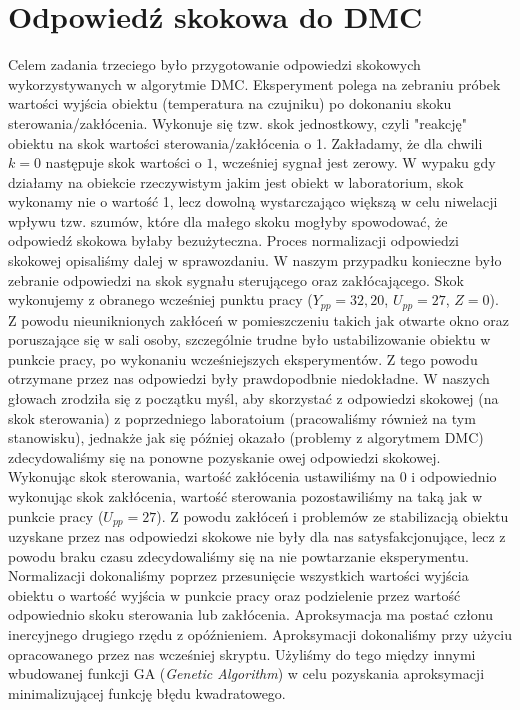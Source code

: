 \chapter{Odpowiedź skokowa do DMC}
Celem zadania trzeciego było przygotowanie odpowiedzi skokowych wykorzystywanych w algorytmie DMC. Eksperyment polega na zebraniu próbek wartości
wyjścia obiektu (temperatura na czujniku) po dokonaniu skoku sterowania/zakłócenia. Wykonuje się tzw. skok jednostkowy, czyli "reakcję" obiektu
na skok wartości sterowania/zakłócenia o 1. Zakładamy, że dla chwili $k=0$ następuje skok wartości o $1$, wcześniej sygnał jest zerowy. W wypaku gdy działamy
na obiekcie rzeczywistym jakim jest obiekt w laboratorium, skok wykonamy nie o wartość 1, lecz dowolną wystarczająco większą w celu niwelacji wpływu tzw. szumów,
które dla małego skoku mogłyby spowodować, że odpowiedź skokowa byłaby bezużyteczna. Proces normalizacji odpowiedzi skokowej opisaliśmy dalej w sprawozdaniu. W naszym
przypadku konieczne było zebranie odpowiedzi na skok sygnału sterującego oraz zakłócającego. Skok wykonujemy
z obranego wcześniej punktu pracy ($Y_{pp} = 32,20$, $U_{pp} = 27$, $Z = 0$). Z powodu nieuniknionych zakłóceń
w pomieszczeniu takich jak otwarte okno oraz poruszające się w sali osoby, szczególnie trudne było ustabilizowanie obiektu w punkcie pracy, po wykonaniu wcześniejszych
eksperymentów. Z tego powodu otrzymane przez nas odpowiedzi były prawdopodbnie niedokładne. W naszych głowach
zrodziła się z początku myśl, aby skorzystać z odpowiedzi skokowej (na skok sterowania) z poprzedniego laboratoium
(pracowaliśmy również na tym stanowisku), jednakże jak się później okazało (problemy z algorytmem DMC) zdecydowaliśmy się
na ponowne pozyskanie owej odpowiedzi skokowej. Wykonując skok sterowania, wartość zakłócenia ustawiliśmy na 0 i odpowiednio
wykonując skok zakłócenia, wartość sterowania pozostawiliśmy na taką jak w punkcie pracy ($U_{pp} = 27$).
Z powodu zakłóceń i problemów ze stabilizacją obiektu uzyskane przez nas odpowiedzi skokowe nie były dla nas satysfakcjonujące,
lecz z powodu braku czasu zdecydowaliśmy się na nie powtarzanie eksperymentu. Normalizacji dokonaliśmy
poprzez przesunięcie wszystkich wartości wyjścia obiektu o wartość wyjścia w punkcie pracy oraz podzielenie przez wartość odpowiednio
skoku sterowania lub zakłócenia. Aproksymacja ma postać członu inercyjnego drugiego rzędu z opóźnieniem. Aproksymacji dokonaliśmy przy użyciu
opracowanego przez nas wcześniej skryptu. Użyliśmy do tego między innymi wbudowanej funkcji GA (\emph{Genetic
Algorithm}) w celu pozyskania aproksymacji minimalizującej funkcję błędu kwadratowego.

